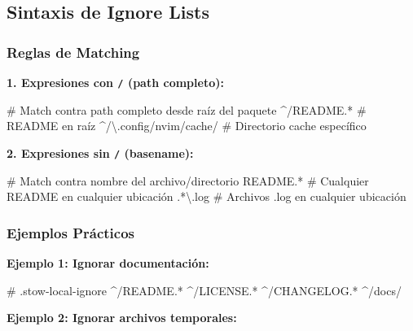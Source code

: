 \documentclass[
  doc,
  floatsintext,
  longtable,
  a4paper,
  nolmodern,
  notxfonts,
  notimes,
  12pt,
  colorlinks=true,linkcolor=blue,citecolor=blue,urlcolor=blue]{apa7}
\newenvironment{Shaded}{\begin{snugshade}}{\end{snugshade}}
\newcommand{\BuiltInTok}[1]{\textcolor[rgb]{0.00,0.23,0.31}{#1}}
\newcommand{\CommentTok}[1]{\textcolor[rgb]{0.37,0.37,0.37}{#1}}
\newcommand{\DataTypeTok}[1]{\textcolor[rgb]{0.68,0.00,0.00}{#1}}
\newcommand{\ExtensionTok}[1]{\textcolor[rgb]{0.00,0.23,0.31}{#1}}
\newcommand{\NormalTok}[1]{\textcolor[rgb]{0.00,0.23,0.31}{#1}}
\newcommand{\PreprocessorTok}[1]{\textcolor[rgb]{0.68,0.00,0.00}{#1}}
\begin{document}
\subsection{Sintaxis de Ignore Lists}\label{sintaxis-de-ignore-lists}

\subsubsection{Reglas de Matching}\label{reglas-de-matching}

\textbf{1. Expresiones con \texttt{/} (path completo):}

\begin{Shaded}
\begin{Highlighting}[]
\CommentTok{\# Match contra path completo desde raíz del paquete}
\ExtensionTok{\^{}/README.*}           \CommentTok{\# README en raíz}
\ExtensionTok{\^{}/\textbackslash{}.config/nvim/cache/}  \CommentTok{\# Directorio cache específico}
\end{Highlighting}
\end{Shaded}

\textbf{2. Expresiones sin \texttt{/} (basename):}

\begin{Shaded}
\begin{Highlighting}[]
\CommentTok{\# Match contra nombre del archivo/directorio}
\ExtensionTok{README.*}      \CommentTok{\# Cualquier README en cualquier ubicación}
\BuiltInTok{.}\PreprocessorTok{*}\DataTypeTok{\textbackslash{}.}\NormalTok{log       }\CommentTok{\# Archivos .log en cualquier ubicación}
\end{Highlighting}
\end{Shaded}

\subsubsection{Ejemplos Prácticos}\label{ejemplos-pruxe1cticos}

\textbf{Ejemplo 1: Ignorar documentación:}

\begin{Shaded}
\begin{Highlighting}[]
\CommentTok{\# .stow{-}local{-}ignore}
\ExtensionTok{\^{}/README.*}
\ExtensionTok{\^{}/LICENSE.*}
\ExtensionTok{\^{}/CHANGELOG.*}
\ExtensionTok{\^{}/docs/}
\end{Highlighting}
\end{Shaded}

\textbf{Ejemplo 2: Ignorar archivos temporales:}
\end{document}
